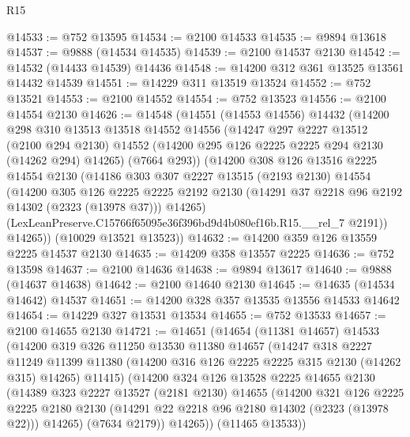 \begin{lexlean}{R15}
\begin{coremodule}
@14533 := @752 @13595
@14534 := @2100 @14533
@14535 := @9894 @13618
@14537 := @9888 (@14534 @14535)
@14539 := @2100 @14537 @2130
@14542 := @14532 (@14433 @14539) @14436
@14548 := @14200 @312 @361 @13525 @13561 @14432 @14539
@14551 := @14229 @311 @13519 @13524
@14552 := @752 @13521
@14553 := @2100 @14552
@14554 := @752 @13523
@14556 := @2100 @14554 @2130
@14626 := @14548
    (@14551
      (@14553 @14556)
      @14432
      (@14200
        @298
        @310
        @13513
        @13518
        @14552
        @14556
        (@14247
          @297
          @2227
          @13512
          (@2100 @294 @2130)
          @14552
          (@14200 @295 @126 @2225 @2225 @294 @2130 (@14262 @294) @14265)
          (@7664 @293))
        (@14200
          @308
          @126
          @13516
          @2225
          @14554
          @2130
          (@14186
            @303
            @307
            @2227
            @13515
            (@2193 @2130)
            @14554
            (@14200
              @305
              @126
              @2225
              @2225
              @2192
              @2130
              (@14291 @37 @2218 @96 @2192 @14302 (@2323 (@13978 @37)))
              @14265)
            (LexLeanPreserve.C15766f65095e36f396bd9d4b080ef16b.R15.__rel_7 @2191))
          @14265))
      (@10029 @13521 @13523))
@14632 := @14200 @359 @126 @13559 @2225 @14537 @2130
@14635 := @14209 @358 @13557 @2225
@14636 := @752 @13598
@14637 := @2100 @14636
@14638 := @9894 @13617
@14640 := @9888 (@14637 @14638)
@14642 := @2100 @14640 @2130
@14645 := @14635 (@14534 @14642) @14537
@14651 := @14200 @328 @357 @13535 @13556 @14533 @14642
@14654 := @14229 @327 @13531 @13534
@14655 := @752 @13533
@14657 := @2100 @14655 @2130
@14721 := @14651
    (@14654
      (@11381 @14657)
      @14533
      (@14200
        @319
        @326
        @11250
        @13530
        @11380
        @14657
        (@14247
          @318
          @2227
          @11249
          @11399
          @11380
          (@14200 @316 @126 @2225 @2225 @315 @2130 (@14262 @315) @14265)
          @11415)
        (@14200
          @324
          @126
          @13528
          @2225
          @14655
          @2130
          (@14389
            @323
            @2227
            @13527
            (@2181 @2130)
            @14655
            (@14200
              @321
              @126
              @2225
              @2225
              @2180
              @2130
              (@14291 @22 @2218 @96 @2180 @14302 (@2323 (@13978 @22)))
              @14265)
            (@7634 @2179))
          @14265))
      (@11465 @13533))

\end{coremodule}
\end{lexlean}
